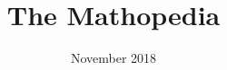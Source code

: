 \documentclass{article}
\begin{document}
\title{The Mathopedia}
\author{}
\date{November 2018}
\maketitle
\end{document}
